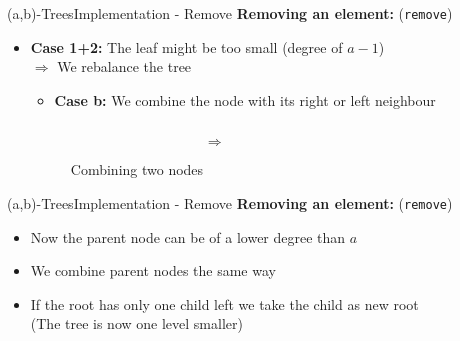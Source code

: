 \begin{frame}{(a,b)-Trees}{Implementation - Remove}
  \textbf{Removing an element:} (\texttt{\color{Mittel-Blau}remove})
  \begin{itemize}
    \item<2->
      \textbf{Case 1+2:}
      The leaf might be too small (degree of {\color{Mittel-Blau}$a-1$})\\
      $\Rightarrow$ We {\color{Mittel-Blau}rebalance} the tree
      \vspace{0.5em}
      \begin{itemize}
        \item<3->
          \textbf{Case b:}
          We {\color{Mittel-Blau}combine} the node with its right or left
          neighbour
      \end{itemize}
      \begin{figure}
        \begin{columns}
          \begin{column}{0.45\linewidth}
            \begin{adjustbox}{width=\linewidth}
              
            \end{adjustbox}
          \end{column}
          \begin{column}{0.1\linewidth}
            \begin{center}
              $\Rightarrow$
            \end{center}
          \end{column}
          \begin{column}{0.45\linewidth}
            \begin{adjustbox}{width=0.85\linewidth}
              
            \end{adjustbox}
          \end{column}
        \end{columns}
        \caption{Combining two nodes}
        \label{fig:a_b_tree:merge}
      \end{figure}
  \end{itemize}
\end{frame}


\begin{frame}{(a,b)-Trees}{Implementation - Remove}
  \textbf{Removing an element:} (\texttt{\color{Mittel-Blau}remove})
  \begin{itemize}
    \item<2->
      Now the parent node can be of a lower degree than
      {\color{Mittel-Blau}$a$}
    \item<3->
      We {\color{Mittel-Blau}combine} parent nodes the same way
    \item<4->
      If the root has only one child left we take the child as new root\\
      (The tree is now one level smaller)
  \end{itemize}
\end{frame}

